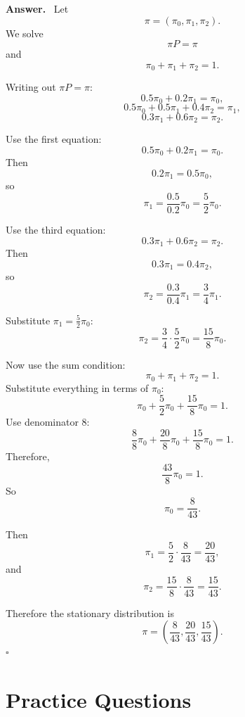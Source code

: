 \documentclass[12pt,a4paper]{article}
\theoremstyle{notestyle}
\newenvironment{answer}
{\par\textbf{Answer.}\ }
{\hfill$\square$\par}
\begin{document}
\begin{answer}
Let
\[
\pi=(\pi_0,\pi_1,\pi_2).
\]
We solve
\[
\pi P=\pi
\]
and
\[
\pi_0+\pi_1+\pi_2=1.
\]

Writing out $\pi P=\pi$:
\[
0.5\pi_0+0.2\pi_1=\pi_0,
\]
\[
0.5\pi_0+0.5\pi_1+0.4\pi_2=\pi_1,
\]
\[
0.3\pi_1+0.6\pi_2=\pi_2.
\]

Use the first equation:
\[
0.5\pi_0+0.2\pi_1=\pi_0.
\]
Then
\[
0.2\pi_1=0.5\pi_0,
\]
so
\[
\pi_1=\frac{0.5}{0.2}\pi_0=\frac52\pi_0.
\]

Use the third equation:
\[
0.3\pi_1+0.6\pi_2=\pi_2.
\]
Then
\[
0.3\pi_1=0.4\pi_2,
\]
so
\[
\pi_2=\frac{0.3}{0.4}\pi_1=\frac34\pi_1.
\]

Substitute $\pi_1=\frac52\pi_0$:
\[
\pi_2=\frac34\cdot\frac52\pi_0=\frac{15}{8}\pi_0.
\]

Now use the sum condition:
\[
\pi_0+\pi_1+\pi_2=1.
\]
Substitute everything in terms of $\pi_0$:
\[
\pi_0+\frac52\pi_0+\frac{15}{8}\pi_0=1.
\]
Use denominator 8:
\[
\frac88\pi_0+\frac{20}{8}\pi_0+\frac{15}{8}\pi_0=1.
\]
Therefore,
\[
\frac{43}{8}\pi_0=1.
\]
So
\[
\pi_0=\frac8{43}.
\]

Then
\[
\pi_1=\frac52\cdot\frac8{43}=\frac{20}{43},
\]
and
\[
\pi_2=\frac{15}{8}\cdot\frac8{43}=\frac{15}{43}.
\]

Therefore the stationary distribution is
\[
\boxed{
\pi=\left(\frac8{43},\frac{20}{43},\frac{15}{43}\right).
}
\]
\end{answer}

\section{Practice Questions}
\end{document}
